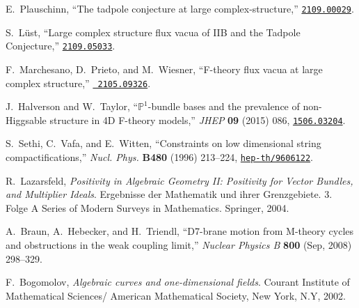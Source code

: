 \documentclass[a4paper,12pt]{article}
\numberwithin{equation}{section}
\begin{document}
\begin{thebibliography}{10}
E.~Plauschinn, ``{The tadpole conjecture at large complex-structure},''
  \href{http://arXiv.org/abs/2109.00029}{{\tt 2109.00029}}.

S.~L\"ust, ``{Large complex structure flux vacua of IIB and the Tadpole
  Conjecture},'' \href{http://arXiv.org/abs/2109.05033}{{\tt 2109.05033}}.

F.~Marchesano, D.~Prieto, and M.~Wiesner, ``{F-theory flux vacua at large
  complex structure},'' \href{http://arXiv.org/abs/2105.09326}{{\tt
  2105.09326}}.

J.~Halverson and W.~Taylor, ``{$ {\mathrm{\mathbb{P}}}^1 $-bundle bases and the
  prevalence of non-Higgsable structure in 4D F-theory models},'' {\em JHEP}
  {\bf 09} (2015) 086,
\href{http://arXiv.org/abs/1506.03204}{{\tt 1506.03204}}.

S.~Sethi, C.~Vafa, and E.~Witten, ``{Constraints on low dimensional string
  compactifications},'' {\em Nucl. Phys.} {\bf B480} (1996) 213--224,
\href{http://arXiv.org/abs/hep-th/9606122}{{\tt hep-th/9606122}}.

R.~Lazarsfeld, {\em Positivity in Algebraic Geometry II: Positivity for Vector
  Bundles, and Multiplier Ideals}.
\newblock Ergebnisse der Mathematik und ihrer Grenzgebiete. 3. Folge A Series
  of Modern Surveys in Mathematics. Springer, 2004.

A.~Braun, A.~Hebecker, and H.~Triendl, ``D7-brane motion from M-theory cycles
  and obstructions in the weak coupling limit,'' {\em Nuclear Physics B} {\bf
  800} (Sep, 2008) 298–329.

F.~Bogomolov, {\em Algebraic curves and one-dimensional fields}.
\newblock Courant Institute of Mathematical Sciences/ American Mathematical
  Society, New York, N.Y, 2002.

\end{thebibliography}\endgroup
\end{document}
